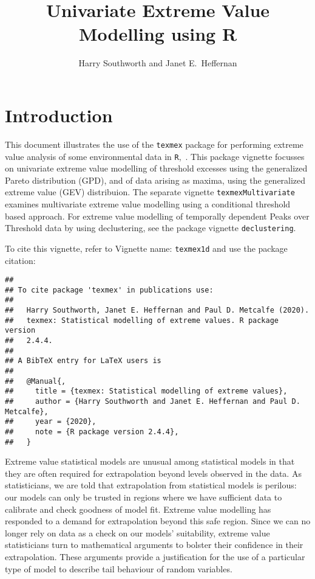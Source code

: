 \documentclass[10pt]{article}\usepackage[]{graphicx}\usepackage[]{color}
\makeatletter
\newenvironment{kframe}{%
 \def\at@end@of@kframe{}%
 \ifinner\ifhmode%
  \def\at@end@of@kframe{\end{minipage}}%
  \begin{minipage}{\columnwidth}%
 \fi\fi%
 \def\FrameCommand##1{\hskip\@totalleftmargin \hskip-\fboxsep
 \colorbox{shadecolor}{##1}\hskip-\fboxsep
     \hskip-\linewidth \hskip-\@totalleftmargin \hskip\columnwidth}%
 \MakeFramed {\advance\hsize-\width
   \@totalleftmargin\z@ \linewidth\hsize
   \@setminipage}}%
 {\par\unskip\endMakeFramed%
 \at@end@of@kframe}
\newenvironment{knitrout}{}{} %
\makeatother
\begin{document}
\title{Univariate Extreme Value Modelling  using R}
\author{Harry Southworth and Janet E.\ Heffernan}
\maketitle

%
\section{Introduction}
%
This document illustrates the use of the {\tt texmex} package
for performing extreme value analysis of some environmental data in {\tt R},~\cite{R}.  This package vignette focusses on univariate extreme value modelling of threshold excesses using the generalized Pareto distribution (GPD), and of data arising as maxima, using the generalized extreme value (GEV) distribuion.  The separate vignette {\tt texmexMultivariate} examines multivariate extreme value
modelling using a conditional threshold based approach.  For extreme value modelling of temporally dependent Peaks over Threshold data by using declustering, see the package vignette {\tt declustering}.

To cite this vignette, refer to Vignette name: {\tt texmex1d} and use the package citation:
\begin{knitrout}
\color{fgcolor}\begin{kframe}
\begin{verbatim}
## 
## To cite package 'texmex' in publications use:
## 
##   Harry Southworth, Janet E. Heffernan and Paul D. Metcalfe (2020).
##   texmex: Statistical modelling of extreme values. R package version
##   2.4.4.
## 
## A BibTeX entry for LaTeX users is
## 
##   @Manual{,
##     title = {texmex: Statistical modelling of extreme values},
##     author = {Harry Southworth and Janet E. Heffernan and Paul D. Metcalfe},
##     year = {2020},
##     note = {R package version 2.4.4},
##   }
\end{verbatim}
\end{kframe}
\end{knitrout}
Extreme value statistical models are unusual among statistical models in that they are often required for extrapolation beyond levels observed in the data.  As statisticians, we are told that extrapolation from statistical models is perilous: our models can only be trusted in regions where we have sufficient data to calibrate and check goodness of model fit.  Extreme value modelling has responded to a demand for extrapolation beyond this safe region.  Since we can no longer rely on data as a check on our models' suitability, extreme value statisticians turn to mathematical arguments to bolster their confidence in their extrapolation.  These arguments provide a justification for the use of a particular type of model to describe tail behaviour of random variables.
\end{document}
